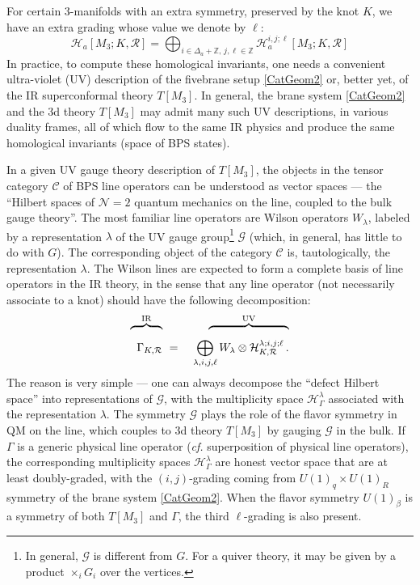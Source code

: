 \documentclass[hyper,letterpaper]{JHEP3}
\newcommand{\bea}{\begin{eqnarray}}
\newcommand{\eea}{\end{eqnarray}}
\newcommand{\Z}{{\mathbb Z}}
\def\CC{{\mathcal C}}
\def\CG{{\mathcal G}}
\def\CH{{\mathcal H}}
\def\CN{{\mathcal N}}
\def\CR{{\mathcal R}}
\begin{document}
For certain 3-manifolds with an extra symmetry, preserved by the knot $K$, we have an extra grading whose value we denote by $\ell$:
\begin{equation}
	\CH_a[M_3;K,\CR]=\bigoplus_{i\in \Delta_a+\Z,\,j,\ell\in\Z}\CH_a^{i,j;\ell}[M_3;K,\CR]
\end{equation}
In practice, to compute these homological invariants, one needs a convenient ultra-violet (UV) description of
the fivebrane setup \eqref{CatGeom2} or, better yet, of the IR superconformal theory $T[M_3]$.
In general, the brane system \eqref{CatGeom2} and the 3d theory $T[M_3]$ may admit many such UV descriptions,
in various duality frames, all of which flow to the same IR physics and produce the same homological invariants (space of BPS states).

In a given UV gauge theory description of $T[M_3]$,
the objects in the tensor category $\CC$ of BPS line operators can be understood as vector spaces ---
the ``Hilbert spaces of $\CN=2$ quantum mechanics on the line, coupled to the bulk gauge theory''.
The most familiar line operators are Wilson operators $W_\lambda$, labeled by a representation $\lambda$
of the UV gauge group\footnote{In general, $\CG$ is different from $G$.
For a quiver theory, it may be given by a product $\times_i G_i$ over the vertices.} $\CG$ (which, in general, has little to do with $G$).
The corresponding object of the category $\CC$ is, tautologically, the representation $\lambda$.
The Wilson lines are expected to form a complete basis of line operators in the IR theory,
in the sense that any line operator (not necessarily associate to a knot) should have the following decomposition:
\bea
\overbrace{\rule{1.0cm}{0pt}}^{\text{IR}} &  & ~~~\overbrace{\rule{2.5cm}{0pt}}^{\text{UV}} \label{Line-UV} \\
\Gamma_{K,\CR} & ~=~ & \bigoplus_{\lambda,i,j,\ell} W_\lambda\otimes \CH_{K,\CR}^{\lambda;i,j;\ell} \,. \nonumber
\eea
The reason is very simple --- one can always decompose the ``defect Hilbert space'' into representations of $\CG$,
with the multiplicity space $\CH_{\Gamma}^{\lambda}$ associated with the representation $\lambda$.
The symmetry $\CG$ plays the role of the flavor symmetry in QM on the line, which couples to 3d theory $T[M_3]$ by gauging $\CG $ in the bulk.
If $\Gamma$ is a generic physical line operator (\textit{cf.} superposition of physical line operators),
the corresponding multiplicity spaces $\CH_{\Gamma}^{\lambda}$ are honest vector space that are at least doubly-graded,
with the $(i,j)$-grading coming from $U(1)_q\times U(1)_R$ symmetry of the brane system \eqref{CatGeom2}.
When the flavor symmetry $U(1)_{\beta}$ is a symmetry of both $T[M_3]$ and $\Gamma$, the third $\ell$-grading is also present.
\end{document}
